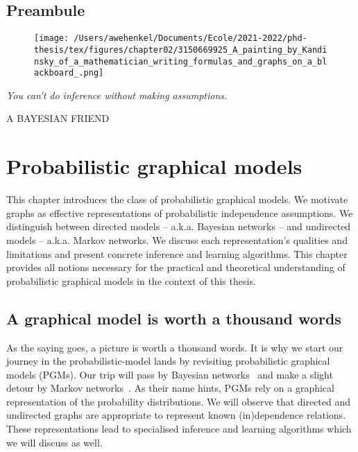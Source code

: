 \thispagestyle{empty}
\section*{Preambule}

\begin{figure}[h]
  \centering

  \texttt{[image: /Users/awehenkel/Documents/Ecole/2021-2022/phd-thesis/tex/figures/chapter02/3150669925\_A\_painting\_by\_Kandinsky\_of\_a\_mathematician\_writing\_formulas\_and\_graphs\_on\_a\_blackboard\_.png]}
  \label{}
\end{figure}

\vfill

{
\textit{\justify
   You can't do inference without making assumptions.}

  \par\bigskip
  \raggedleft\MakeUppercase{A Bayesian friend}\\
  \par%
}


\chapter{Probabilistic graphical models}\label{ch:02B}

\begin{chapter_outline}

This chapter introduces the class of probabilistic graphical models. We motivate graphs as effective representations of probabilistic independence assumptions. We distinguish between directed models -- a.k.a. Bayesian networks -- and undirected models -- a.k.a. Markov networks. We discuss each representation's qualities and limitations and present concrete inference and learning algorithms. This chapter provides all notions necessary for the practical and theoretical understanding of probabilistic graphical models in the context of this thesis.
\end{chapter_outline}

\section{A graphical model is worth a thousand words}
As the saying goes, a picture is worth a thousand words. It is why we start our journey in the probabilistic-model lands by revisiting probabilistic graphical models (PGMs). Our trip will pass by Bayesian networks~\citep{pearl2011bayesian} and make a slight detour by Markov networks~\citep{kindermann1980markov}. As their name hints, PGMs rely on a graphical representation of the probability distributions. We will observe that directed and undirected graphs are appropriate to represent known (in)dependence relations. These representations lead to specialised inference and learning algorithms which we will discuss as well.

